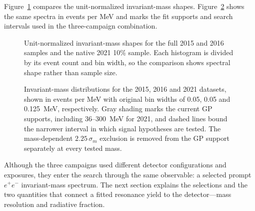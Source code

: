Figure~\ref{fig:dataset-mass-shape-overlay} compares the unit-normalized invariant-mass
shapes. Figure~\ref{fig:dataset-mass-distributions-log} shows the same spectra in
events per MeV and marks the fit supports and search intervals used in the
three-campaign combination.

\begin{figure}[H]
\centering
{}
\caption{Unit-normalized invariant-mass shapes for the full 2015 and 2016 samples
and the native 2021 10\% sample. Each histogram is divided by its event count and bin
width, so the comparison shows spectral shape rather than sample size.}
\label{fig:dataset-mass-shape-overlay}
\end{figure}

\begin{figure}[H]
\centering
{}
\caption{Invariant-mass distributions for the 2015, 2016 and 2021 datasets, shown in
events per MeV with original bin widths of 0.05, 0.05 and 0.125~MeV, respectively. Gray shading
marks the current GP supports, including 36--300~MeV for 2021, and dashed lines
bound the narrower interval in which signal hypotheses are tested. The mass-dependent
$2.25\,\sigma_m$ exclusion is removed from the GP support separately at every tested
mass.}
\label{fig:dataset-mass-distributions-log}
\end{figure}

Although the three campaigns used different detector configurations and exposures,
they enter the search through the same observable: a selected prompt $e^+e^-$
invariant-mass spectrum. The next section explains the selections and the two quantities
that connect a fitted resonance yield to the detector---mass resolution and radiative
fraction.
